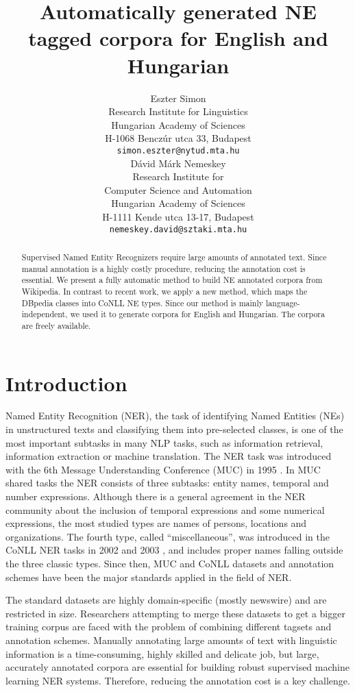 \documentclass[11pt]{article}
\title{Automatically generated NE tagged corpora for English and Hungarian}
\author{Eszter Simon \\
  Research Institute for Linguistics \\
  Hungarian Academy of Sciences \\
  H-1068 Benczúr utca 33, Budapest \\
  {\tt simon.eszter@nytud.mta.hu} \\\And
  Dávid Márk Nemeskey \\
  Research Institute for \\ Computer Science and Automation \\
  Hungarian Academy of Sciences \\
  H-1111 Kende utca 13-17, Budapest \\
  {\tt nemeskey.david@sztaki.mta.hu} \\}
\date{}
\begin{document}
\maketitle
\begin{abstract}

Supervised Named Entity Recognizers require large amounts of annotated
text. Since manual annotation is a highly costly procedure, reducing the
annotation cost is essential. We present a fully automatic method to build NE
annotated corpora from Wikipedia. In contrast to recent work, we apply a new
method, which maps the DBpedia classes into CoNLL NE types. Since our method
is mainly language-independent, we used it to generate corpora for English
and Hungarian. The corpora are freely available.

\end{abstract}

\section{Introduction}
\label{sec:intro}

Named Entity Recognition (NER), the task of identifying Named Entities (NEs) in unstructured texts and classifying them into pre-selected classes, is one of the most important subtasks in many NLP tasks, such as information retrieval, information extraction or machine translation. The NER task was introduced with the 6th Message Understanding Conference (MUC) in 1995 \cite{Grishman:96}. In MUC shared tasks the NER consists of three subtasks: entity names, temporal and number expressions. Although there is a general agreement in the NER community about the inclusion of temporal expressions and some numerical expressions, the most studied types are names of persons, locations and organizations. The fourth type, called ``miscellaneous'', was introduced in the CoNLL NER tasks in 2002 \cite{Tjong:02} and 2003 \cite{Tjong:03}, and includes proper names falling outside the three classic types. Since then, MUC and CoNLL datasets and annotation schemes have been the major standards applied in the field of NER. 

The standard datasets are highly domain-specific (mostly newswire) and are
restricted in size. Researchers attempting to merge these datasets to get a bigger training corpus are faced with the
problem of combining different tagsets and annotation schemes. Manually
annotating large amounts of text with linguistic information is a
time-consuming, highly skilled and delicate job, but large, accurately
annotated corpora are essential for building robust supervised machine
learning NER systems. Therefore, reducing the annotation cost is a key
challenge.
\end{document}

